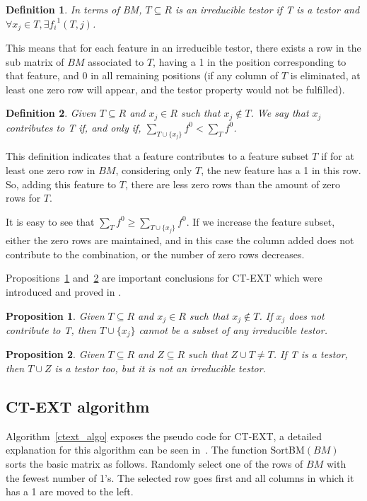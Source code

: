 \documentclass[authoryear,preprint,review,12pt]{elsarticle}
\newtheorem{definition}{Definition}
\newtheorem{proposition}{Proposition}
\begin{document}
\begin{definition} \label{def24} In terms of BM, $T \subseteq R$ is an irreducible testor if T is a testor and
$\forall x_j \in T, \exists {f_i}^1 (T, j)$.
\end{definition}

This means that for each feature in an irreducible testor, there exists a row in 
the sub matrix of $BM$ associated to $T$, having a 1 in the position corresponding
to that feature, and 0 in all remaining positions (if any column of $T$ is eliminated, 
at least one zero row will appear, and the testor property would not be fulfilled). 

\begin{definition} \label{def25} Given $T \subseteq R$ and $x_j \in R$ such that $x_j \notin T$. 
We say that $x_j$ contributes to T if, and only if, $\sum_{T\cup\{x_j\}} f^0 < \sum_T f^0$.
\end{definition}
This definition indicates that a feature contributes to a feature subset $T$
if for at least one zero row in $BM$, considering only $T$, the new feature has a 1 in 
this row. So, adding this feature to $T$, there are less
zero rows than the amount of zero rows for $T$.

It is easy to see that $\sum_T f^0 \geq \sum_{T\cup\{x_j\}} f^0$. If we
increase the feature subset, either the zero rows are maintained, and in this
case the column added does not contribute to the combination, or the number of zero rows decreases.

Propositions~\ref{prop1} and~\ref{prop2} are important conclusions for CT-EXT which were introduced and 
proved in \citep{R22}.

\begin{proposition}\label{prop1} Given $T \subseteq R$ and  $x_j \in R$ such that $x_j \notin T$. If $x_j$ does not contribute to T, then $T\cup\{x_j\}$ cannot be a subset of any irreducible testor.
\end{proposition}

\begin{proposition}\label{prop2} Given $T \subseteq R$ and $Z \subseteq R$ such that $Z \cup T \neq T$. If T is a testor, 
then $T \cup Z$ is a testor too, but it is not an irreducible testor.
\end{proposition}

\subsection{CT-EXT algorithm}
Algorithm~\ref{ctext_algo} exposes the pseudo code for CT-EXT, a detailed explanation for 
this algorithm can be seen in~\citep{R22}. The function SortBM$(BM)$ sorts the basic matrix as follows.
Randomly select one of the rows of $BM$ with the fewest number of 1's. The selected row goes first and 
all columns in which it has a 1 are moved to the left.  
\end{document}
